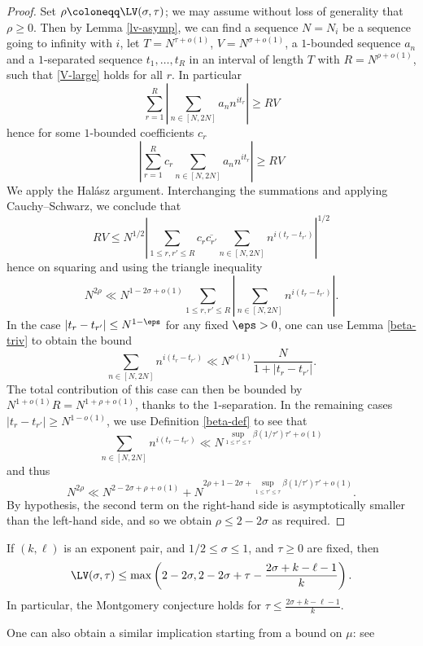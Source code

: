 \begin{proof}  Set $\rho \coloneqq \LV(\sigma,\tau)$; we may assume without loss of generality that $\rho \geq 0$.  Then by Lemma \ref{lv-asymp}, we can find a sequence $N = N_i$ be a sequence going to infinity with $i$, let $T = N^{\tau + o(1)}$, $V = N^{\sigma + o(1)}$, a $1$-bounded sequence $a_n$ and a $1$-separated sequence $t_1,\dots,t_R$ in an interval of length $T$ with $R = N^{\rho+o(1)}$, such that \eqref{V-large} holds for all $r$.  In particular
$$ \sum_{r=1}^R \left|\sum_{n \in [N,2N]} a_n n^{it_r} \right| \geq RV$$
hence for some $1$-bounded coefficients $c_r$
$$ \left|\sum_{r=1}^R c_r \sum_{n \in [N,2N]} a_n n^{it_r} \right| \geq RV$$
We apply the Hal\'asz argument. Interchanging the summations and applying Cauchy--Schwarz, we conclude that
$$ RV \leq N^{1/2} \left|\sum_{1 \leq r,r' \leq R} c_r \overline{c_{r'}} \sum_{n \in [N,2N]} n^{i(t_r-t_{r'})} \right|^{1/2}$$
hence on squaring and using the triangle inequality
$$ N^{2\rho} \ll N^{1-2\sigma+o(1)} \sum_{1 \leq r,r' \leq R} \left|\sum_{n \in [N,2N]} n^{i(t_r-t_{r'})} \right|.$$
In the case $|t_r - t_{r'}| \leq N^{1-\eps}$ for any fixed $\eps>0$, one can use Lemma \ref{beta-triv} to obtain the bound
$$ \sum_{n \in [N,2N]} n^{i(t_r-t_{r'})} \ll N^{o(1)} \frac{N}{1 + |t_r - t_{r'}|}.$$
The total contribution of this case can then be bounded by $N^{1+o(1)} R = N^{1+\rho+o(1)}$, thanks to the $1$-separation.
In the remaining cases $|t_r - t_{r'}| \geq N^{1-o(1)}$, we use Definition \ref{beta-def} to see that
$$ \sum_{n \in [N,2N]} n^{i(t_r-t_{r'})} \ll N^{\sup_{1 \leq \tau' \leq \tau} \beta(1/\tau') \tau' + o(1)}$$
and thus
$$ N^{2\rho} \ll N^{2-2\sigma+\rho+o(1)} + N^{2\rho + 1-2\sigma+\sup_{1 \leq \tau' \leq \tau} \beta(1/\tau') \tau' + o(1)}.$$
By hypothesis, the second term on the right-hand side is asymptotically smaller than the left-hand side, and so we obtain $\rho \leq 2-2\sigma$ as required.
\end{proof}

\begin{corollary}\label{exp-lv}  If $(k,\ell)$ is an exponent pair, and $1/2 \leq \sigma \leq 1$, and $\tau \geq 0$ are fixed, then
$$\LV(\sigma,\tau) \leq \max\left( 2-2\sigma, 2 - 2\sigma + \tau - \frac{2\sigma+k-\ell-1}{k} \right).$$
In particular, the Montgomery conjecture holds for $\tau \leq \frac{2\sigma+k-\ell-1}{k}$.
\end{corollary}

One can also obtain a similar implication starting from a bound on $\mu$: see 

